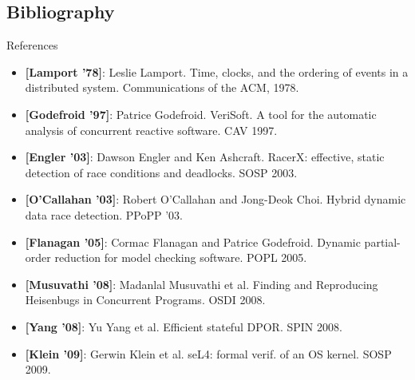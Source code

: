 \documentclass[xcolor=dvipsnames]{beamer}
\begin{document}

\subsection{Bibliography}

\begin{frame}{References}
	\footnotesize
	\begin{itemize}
		\item {\bf [Lamport '78]}:
			Leslie Lamport. Time, clocks, and the ordering of events in a distributed system.
			Communications of the ACM, 1978.
		\item {\bf [Godefroid '97]}: Patrice Godefroid.
			VeriSoft. A tool for the automatic analysis of concurrent reactive software. CAV 1997.
		\item {\bf [Engler '03]}: Dawson Engler and Ken Ashcraft.
			RacerX: effective, static detection of race conditions and deadlocks. SOSP 2003.
		\item {\bf [O'Callahan '03]}: Robert O'Callahan and Jong-Deok Choi.
			Hybrid dynamic data race detection. PPoPP '03.
		\item {\bf [Flanagan '05]}: Cormac Flanagan and Patrice Godefroid. Dynamic partial-order reduction for
			model checking software. POPL 2005.
		\item {\bf [Musuvathi '08]}: Madanlal Musuvathi et al. Finding and Reproducing Heisenbugs in Concurrent
			Programs. OSDI 2008.
		\item {\bf [Yang '08]}: Yu Yang et al. Efficient stateful DPOR. SPIN 2008.
		\item {\bf [Klein '09]}: Gerwin Klein et al. seL4: formal verif. of an OS kernel. SOSP 2009.
	\end{itemize}
\end{frame}
\end{document}
